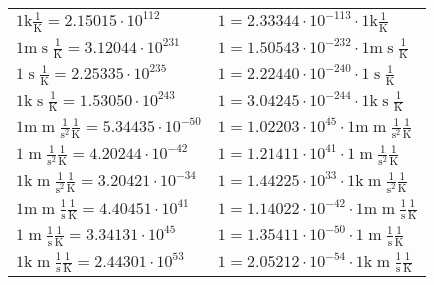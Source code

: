 \begin{center}
\begin{longtable}{l l}
{\color{gray}$1 \bm{\mathrm{ k}}{}{}{}\frac1{\operatorname{K}} = 2.15015\cdot10^{112} $}   & {\color{gray}$ 1 = 2.33344\cdot10^{-113} \cdot 1 \bm{\mathrm{ k}}{}{}{}\frac1{\operatorname{K}}$}  \\
{\color{gray}$1 \bm{\mathrm{ m}}{}{\operatorname{s}}{}\frac1{\operatorname{K}} = 3.12044\cdot10^{231} $}   & {\color{gray}$ 1 = 1.50543\cdot10^{-232} \cdot 1 \bm{\mathrm{ m}}{}{\operatorname{s}}{}\frac1{\operatorname{K}}$}  \\
{\color{black}$1 \bm{\mathrm{ }}{}{\operatorname{s}}{}\frac1{\operatorname{K}} = 2.25335\cdot10^{235} $}   & {\color{black}$ 1 = 2.22440\cdot10^{-240} \cdot 1 \bm{\mathrm{ }}{}{\operatorname{s}}{}\frac1{\operatorname{K}}$}  \\
{\color{gray}$1 \bm{\mathrm{ k}}{}{\operatorname{s}}{}\frac1{\operatorname{K}} = 1.53050\cdot10^{243} $}   & {\color{gray}$ 1 = 3.04245\cdot10^{-244} \cdot 1 \bm{\mathrm{ k}}{}{\operatorname{s}}{}\frac1{\operatorname{K}}$}  \\
{\color{gray}$1 \bm{\mathrm{ m}}{\operatorname{m}}\frac1{\operatorname{s}^2}{}\frac1{\operatorname{K}} = 5.34435\cdot10^{-50} $}   & {\color{gray}$ 1 = 1.02203\cdot10^{45} \cdot 1 \bm{\mathrm{ m}}{\operatorname{m}}\frac1{\operatorname{s}^2}{}\frac1{\operatorname{K}}$}  \\
{\color{black}$1 \bm{\mathrm{ }}{\operatorname{m}}\frac1{\operatorname{s}^2}{}\frac1{\operatorname{K}} = 4.20244\cdot10^{-42} $}   & {\color{black}$ 1 = 1.21411\cdot10^{41} \cdot 1 \bm{\mathrm{ }}{\operatorname{m}}\frac1{\operatorname{s}^2}{}\frac1{\operatorname{K}}$}  \\
{\color{gray}$1 \bm{\mathrm{ k}}{\operatorname{m}}\frac1{\operatorname{s}^2}{}\frac1{\operatorname{K}} = 3.20421\cdot10^{-34} $}   & {\color{gray}$ 1 = 1.44225\cdot10^{33} \cdot 1 \bm{\mathrm{ k}}{\operatorname{m}}\frac1{\operatorname{s}^2}{}\frac1{\operatorname{K}}$}  \\
{\color{gray}$1 \bm{\mathrm{ m}}{\operatorname{m}}\frac1{\operatorname{s}}{}\frac1{\operatorname{K}} = 4.40451\cdot10^{41} $}   & {\color{gray}$ 1 = 1.14022\cdot10^{-42} \cdot 1 \bm{\mathrm{ m}}{\operatorname{m}}\frac1{\operatorname{s}}{}\frac1{\operatorname{K}}$}  \\
{\color{black}$1 \bm{\mathrm{ }}{\operatorname{m}}\frac1{\operatorname{s}}{}\frac1{\operatorname{K}} = 3.34131\cdot10^{45} $}   & {\color{black}$ 1 = 1.35411\cdot10^{-50} \cdot 1 \bm{\mathrm{ }}{\operatorname{m}}\frac1{\operatorname{s}}{}\frac1{\operatorname{K}}$}  \\
{\color{gray}$1 \bm{\mathrm{ k}}{\operatorname{m}}\frac1{\operatorname{s}}{}\frac1{\operatorname{K}} = 2.44301\cdot10^{53} $}   & {\color{gray}$ 1 = 2.05212\cdot10^{-54} \cdot 1 \bm{\mathrm{ k}}{\operatorname{m}}\frac1{\operatorname{s}}{}\frac1{\operatorname{K}}$}  \\

\end{longtable}
\end{center}
